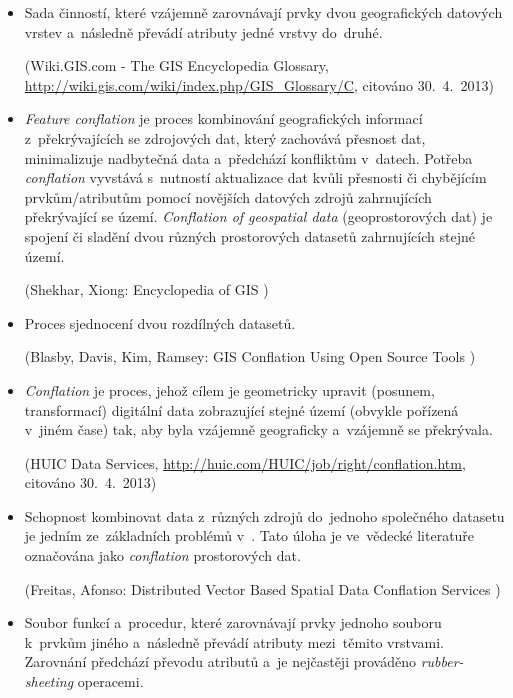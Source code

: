 \begin{itemize}

  \item Sada činností, které vzájemně zarovnávají prvky dvou geografických
    datových vrstev a~následně převádí atributy jedné vrstvy do~druhé.
    
    (Wiki.GIS.com - The GIS Encyclopedia Glossary, 
    \url{http://wiki.gis.com/wiki/index.php/GIS\_Glossary/C},
    citováno 30.~4.~2013)

  \item \textit{Feature conflation} je proces kombinování geografických 
    informací z~překrývajících se zdrojových dat, který zachovává přesnost 
    dat, minimalizuje nadbytečná data a~předchází konfliktům v~datech.
    Potřeba \textit{conflation} vyvstává s~nutností aktualizace dat kvůli
    přesnosti či chybějícím prvkům/atributům pomocí novějších datových zdrojů
    zahrnujících překrývající se území.
    \textit{Conflation of geospatial data} (geoprostorových dat) je spojení
    či sladění dvou různých prostorových datasetů zahrnujících stejné území.
     
    (Shekhar, Xiong: Encyclopedia of GIS \cite[][s.~129]{gisencyclopedia})

  \item Proces sjednocení dvou rozdílných datasetů.
    
    (Blasby, Davis, Kim, Ramsey: GIS Conflation Using Open Source Tools 
    \cite[][s.~2]{opensourceconflation})

 \item \textit{Conflation} je proces, jehož cílem je geometricky upravit 
    (posunem, transformací) di\-gitální data zobrazující stejné území 
    (obvykle pořízená v~jiném čase) tak, aby byla vzájemně geograficky 
     a~vzájemně se překrývala.
    
    (HUIC Data Services, \url{http://huic.com/HUIC/job/right/conflation.htm}, 
     citováno 30.~4.~2013)

  \item Schopnost kombinovat data z~různých zdrojů do~jednoho společného
    datasetu je jedním ze~základních problémů v~. Tato úloha je
    ve~vědecké literatuře označována jako \textit{conflation} prostorových
    dat.
   
    (Freitas, Afonso: Distributed Vector Based Spatial Data Conflation 
    Services \cite[][s.~23]{freitas})

  \item Soubor funkcí a~procedur, které zarovnávají prvky jednoho  
    souboru k~prvkům jiného a~následně převádí atributy mezi~těmito vrstvami.
    Zarovnání předchází převodu atributů a~je nejčastěji prováděno 
    \textit{rubber-sheeting} operacemi.
   

\end{itemize}

